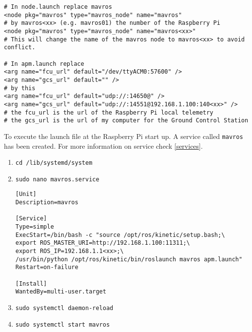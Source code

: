                 \begin{verbatim}
# In node.launch replace mavros 
<node pkg="mavros" type="mavros_node" name="mavros"
# by mavros<xx> (e.g. mavros01) the number of the Raspberry Pi
<node pkg="mavros" type="mavros_node" name="mavros<xx>"
# This will change the name of the mavros node to mavros<xx> to avoid conflict.

# In apm.launch replace
<arg name="fcu_url" default="/dev/ttyACM0:57600" />
<arg name="gcs_url" default="" />
# by this
<arg name="fcu_url" default="udp://:14650@" />
<arg name="gcs_url" default="udp://:14551@192.168.1.100:140<xx>" />
# the fcu_url is the url of the Raspberry Pi local telemetry
# the gcs_url is the url of my computer for the Ground Control Station
                \end{verbatim}
                
                To execute the launch file at the Raspberry Pi start up. A service called \texttt{mavros} has been created.
                For more information on service check \ref{services}.
                
                \begin{enumerate}
                    \item \texttt{cd /lib/systemd/system}
                    \item \texttt{sudo nano mavros.service}
                    \begin{verbatim}
[Unit]
Description=mavros 

[Service]
Type=simple
ExecStart=/bin/bash -c "source /opt/ros/kinetic/setup.bash;\
export ROS_MASTER_URI=http://192.168.1.100:11311;\
export ROS_IP=192.168.1.1<xx>;\
/usr/bin/python /opt/ros/kinetic/bin/roslaunch mavros apm.launch"
Restart=on-failure

[Install]
WantedBy=multi-user.target
                    \end{verbatim}
                    \item \texttt{sudo systemctl daemon-reload}
                    \item \texttt{sudo systemctl start mavros}
                \end{enumerate}
            
